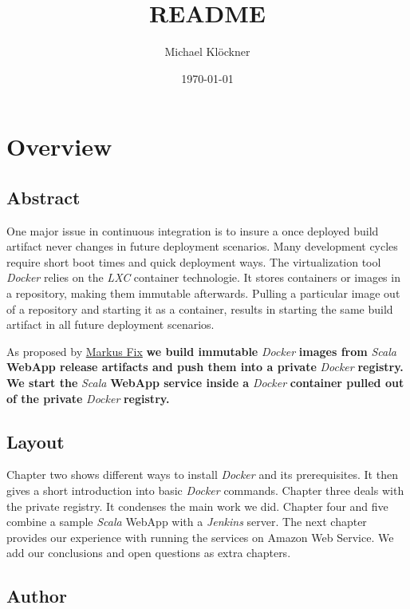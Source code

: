 \documentclass[11pt]{article}
\title{README}
\author{Michael Klöckner}
\date{\today}
\begin{document}
\maketitle

\setcounter{tocdepth}{2}
\tableofcontents
\vspace*{1cm}



\section{Overview}
\label{sec-1}
\subsection{Abstract}
\label{sec-1-1}

One major issue in continuous integration is to insure a once deployed build artifact never changes in future deployment scenarios. Many development cycles require short boot times and quick deployment ways. The virtualization tool \emph{Docker} relies on the \emph{LXC} container technologie. It stores containers or images in a repository, making them immutable afterwards. Pulling a particular image out of a repository and starting it as a container, results in starting the same build artifact in all future deployment scenarios. 

As proposed by \href{http://deeprecursion.com/}{Markus Fix} \textbf{we build immutable} \emph{Docker} \textbf{images  from} \emph{Scala} \textbf{WebApp release artifacts and push them into a private} \emph{Docker} \textbf{registry. We start the} \emph{Scala} \textbf{WebApp service inside a} \emph{Docker} \textbf{container pulled out of the private} \emph{Docker} \textbf{registry.} 
\subsection{Layout}
\label{sec-1-2}

Chapter two shows different ways to install \emph{Docker} and its prerequisites. It then gives a short introduction into basic \emph{Docker} commands. Chapter three deals with the private registry. It condenses the main work we did. Chapter four and five combine a sample \emph{Scala} WebApp with a \emph{Jenkins} server. The next chapter provides our experience with running the services on Amazon Web Service. We add our conclusions and open questions as extra chapters.  
\subsection{Author}
\label{sec-1-3}
\end{document}
